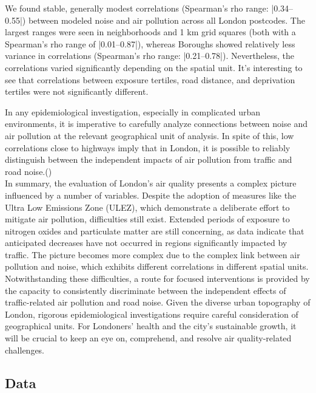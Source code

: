 \documentclass{article}
\begin{document}
	
	We found stable, generally modest correlations (Spearman's rho range: |0.34–0.55|) between modeled noise and air pollution across all London postcodes. The largest ranges were seen in neighborhoods and 1 km grid squares (both with a Spearman's rho range of |0.01–0.87|), whereas Boroughs showed relatively less variance in correlations (Spearman's rho range: |0.21–0.78|). Nevertheless, the correlations varied significantly depending on the spatial unit. It's interesting to see that correlations between exposure tertiles, road distance, and deprivation tertiles were not significantly different.
	
	
	In any epidemiological investigation, especially in complicated urban environments, it is imperative to carefully analyze connections between noise and air pollution at the relevant geographical unit of analysis. In spite of this, low correlations close to highways imply that in London, it is possible to reliably distinguish between the independent impacts of air pollution from traffic and road noise.(\textcite{Fecht2016})\\
	
	In summary, the evaluation of London's air quality presents a complex picture influenced by a number of variables. Despite the adoption of measures like the Ultra Low Emissions Zone (ULEZ), which demonstrate a deliberate effort to mitigate air pollution, difficulties still exist. Extended periods of exposure to nitrogen oxides and particulate matter are still concerning, as data indicate that anticipated decreases have not occurred in regions significantly impacted by traffic. The picture becomes more complex due to the complex link between air pollution and noise, which exhibits different correlations in different spatial units. Notwithstanding these difficulties, a route for focused interventions is provided by the capacity to consistently discriminate between the independent effects of traffic-related air pollution and road noise.
	 Given the diverse urban topography of London, rigorous epidemiological investigations require careful consideration of geographical units. For Londoners' health and the city's sustainable growth, it will be crucial to keep an eye on, comprehend, and resolve air quality-related challenges.\\
	\newpage
	
	
	\begin{center}
		\section{Data}
	\end{center}
\end{document}
